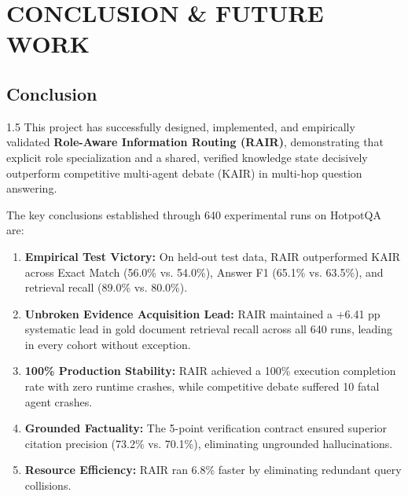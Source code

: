 \documentclass[12pt,a4paper]{report}
\begin{document}
\chapter{CONCLUSION \& FUTURE WORK}

\section{Conclusion}
\begin{spacing}{1.5}
This project has successfully designed, implemented, and empirically validated \textbf{Role-Aware Information Routing (RAIR)}, demonstrating that explicit role specialization and a shared, verified knowledge state decisively outperform competitive multi-agent debate (KAIR) in multi-hop question answering.

The key conclusions established through 640 experimental runs on HotpotQA are:
\begin{enumerate}
    \item \textbf{Empirical Test Victory:} On held-out test data, RAIR outperformed KAIR across Exact Match (56.0\% vs. 54.0\%), Answer F1 (65.1\% vs. 63.5\%), and retrieval recall (89.0\% vs. 80.0\%).
    \item \textbf{Unbroken Evidence Acquisition Lead:} RAIR maintained a +6.41 pp systematic lead in gold document retrieval recall across all 640 runs, leading in every cohort without exception.
    \item \textbf{100\% Production Stability:} RAIR achieved a 100\% execution completion rate with zero runtime crashes, while competitive debate suffered 10 fatal agent crashes.
    \item \textbf{Grounded Factuality:} The 5-point verification contract ensured superior citation precision (73.2\% vs. 70.1\%), eliminating ungrounded hallucinations.
    \item \textbf{Resource Efficiency:} RAIR ran 6.8\% faster by eliminating redundant query collisions.
\end{enumerate}
\end{spacing}
\end{document}
